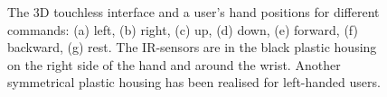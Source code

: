 \begin{figure}[h!]
\centering
{}
\caption{The 3D touchless interface and a user's hand positions for different commands: (a) left, (b) right, (c) up, (d) down, (e) forward, (f) backward, (g) rest. The IR-sensors are in the black plastic housing on the right side of the hand and around the wrist. Another symmetrical plastic housing has been realised for left-handed users.} 
\label{fig:3D-touchless}
\end{figure}   

